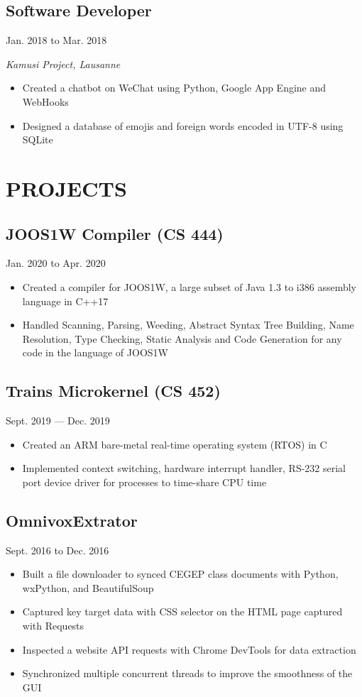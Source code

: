 \documentclass[11pt]{extarticle}
\begin{document}
\subsection*{Software Developer} \hfill Jan. 2018 to Mar. 2018

\textit{Kamusi Project, Lausanne}
\begin{itemize}
  \item Created a chatbot on WeChat using Python, Google App Engine and WebHooks
  \item Designed a database of emojis and foreign words encoded in UTF-8 using SQLite
\end{itemize}


\section*{PROJECTS}
\subsection*{JOOS1W Compiler (CS 444)} \hfill Jan. 2020 to Apr. 2020
\begin{itemize}
  \item Created a compiler for JOOS1W, a large subset of Java 1.3 to i386 assembly language in C++17
  \item Handled Scanning, Parsing, Weeding, Abstract Syntax Tree Building, Name Resolution, Type Checking, Static Analysis and Code Generation for any code in the language of JOOS1W
\end{itemize}

\subsection*{Trains Microkernel (CS 452)} \hfill Sept. 2019 --- Dec. 2019
\begin{itemize}
  \item Created an ARM bare-metal real-time operating system (RTOS) in C
  \item Implemented context switching, hardware interrupt handler, RS-232 serial port device driver for processes to time-share CPU time
\end{itemize}

\subsection*{OmnivoxExtrator} \hfill Sept. 2016 to Dec. 2016
\begin{itemize}
  \item Built a file downloader to synced CEGEP class documents with Python, wxPython, and BeautifulSoup
  \item Captured key target data with CSS selector on the HTML page captured with Requests
  \item Inspected a website API requests with Chrome DevTools for data extraction
  \item Synchronized multiple concurrent threads to improve the smoothness of the GUI
\end{itemize}
\end{document}
